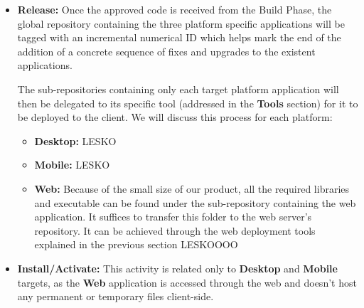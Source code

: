 \documentclass[12pt]{report}
\begin{document}
\begin{itemize}
    \item \textbf{Release:}
    Once the approved code is received from the Build Phase, the global repository containing the three platform specific applications will be tagged with an incremental numerical ID which helps mark the end of the addition of a concrete sequence of fixes and upgrades to the existent applications. 
    
    The sub-repositories containing only each target platform application will then be delegated to its specific tool (addressed in the \textbf{Tools} section) for it to be deployed to the client. We will discuss this process for each platform:
    \begin{itemize}
        \item \textbf{Desktop:} LESKO
        \item \textbf{Mobile:} LESKO
        \item \textbf{Web:} Because of the small size of our product, all the required libraries and executable can be found under the sub-repository containing the web application. It suffices to transfer this folder to the web server's repository. It can be achieved through the web deployment tools explained in the previous section LESKOOOO
    \end{itemize}
    \item \textbf{Install/Activate:}
    This activity is related only to \textbf{Desktop} and \textbf{Mobile} targets, as the \textbf{Web} application is accessed through the web and doesn't host any permanent or temporary files client-side.
    

\end{itemize}
\end{document}
